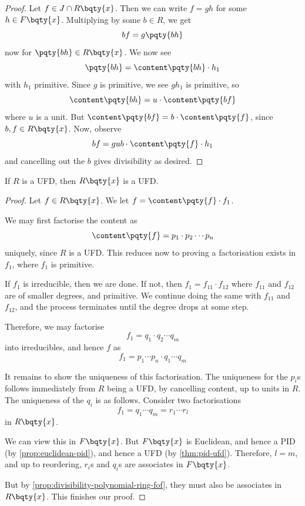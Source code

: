 \begin{proof}
    Let \(f \in J \cap R\bqty{x}\). Then we can write \(f = gh\) for some \(h \in F\bqty{x}\). Multiplying by some \(b \in R\), we get
    \[
        bf = g \pqty{bh}
    \]
    now for \(\pqty{bh} \in R\bqty{x}\). We now see
    \[
        \pqty{bh} = \content\pqty{bh} \cdot h_1
    \]
    with \(h_1\) primitive. Since \(g\) is primitive, we see \(g h_1\) is primitive, so
    \[
        \content\pqty{bh} = u \cdot \content\pqty{bf}
    \] 
    where \(u\) is a unit. But \(\content\pqty{bf} = b \cdot \content\pqty{f}\), since \(b, f \in R\bqty{x}\). Now, observe
    \[
        bf = g u b \cdot \content\pqty{f} \cdot h_1
    \]
    and cancelling out the \(b\) gives divisibility as desired.
\end{proof}

\begin{theorem}
    \label{thm:poynomial-over-ufd-ufd}%
    If \(R\) is a UFD, then \(R\bqty{x}\) is a UFD.
\end{theorem}

\begin{proof}
    Let \(f \in R\bqty{x}\). We let \(f = \content\pqty{f} \cdot f_1\).

    We may first factorise the content as
    \[
        \content\pqty{f} = p_1 \cdot p_2 \cdots p_n
    \]
    uniquely, since \(R\) is a UFD. This reduces now to proving a factorisation exists in \(f_1\), where \(f_1\) is primitive.

    If \(f_1\) is irreducible, then we are done. If not, then \(f_1 = f_{11} \cdot f_{12}\) where \(f_{11}\) and \(f_{12}\) are of smaller degrees, and primitive. We continue doing the same with \(f_{11}\) and \(f_{12}\), and the process terminates until the degree drops at some step.
    
    Therefore, we may factorise
    \[
        f_1 = q_1 \cdot q_2 \cdots q_m
    \]
    into irreducibles, and hence \(f\) as
    \[
        f_1 = p_1 \cdots p_n \cdot q_1 \cdots q_m
    \]

    It remains to show the uniqueness of this factorisation. The uniqueness for the \(p_i\)s follows immediately from \(R\) being a UFD, by cancelling content, up to units in \(R\). The uniqueness of the \(q_i\) is as follows. Consider two factorisations
    \[
        f_1 = q_1 \cdots q_m = r_1 \cdots r_l
    \]
    in \(R\bqty{x}\).

    We can view this in \(F\bqty{x}\). But \(F\bqty{x}\) is Euclidean, and hence a PID (by \autoref{prop:euclidean-pid}), and hence a UFD (by \autoref{thm:pid-ufd}). Therefore, \(l = m\), and up to reordering, \(r_i\)s and \(q_i\)s are associates in \(F\bqty{x}\).

    But by \autoref{prop:divisibility-polynomial-ring-fof}, they must also be associates in \(R\bqty{x}\). This finishes our proof.
\end{proof}

